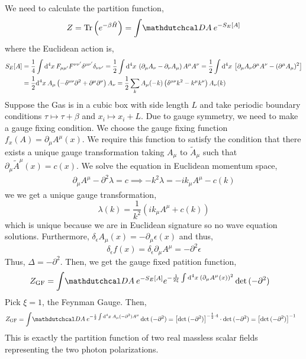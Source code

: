 \documentclass[12pt]{extarticle}
\begin{document}
We need to calculate the partition function,
\begin{align*}
Z = \Tr{e^{- \beta \hamilt}} = \int \pathd{A} e^{- S_E[A]} 
\end{align*}
where the Euclidean action is,
\begin{align*}
S_E[A] & = \frac{1}{4} \int \mathrm{d}^{4} x \: F_{\mu \mu'} F^{\nu \nu'} \delta^{\mu \nu'} \delta_{\nu \nu'} = \frac{1}{2} \int \mathrm{d}^{4} x \: \left( \partial_\mu A_{\nu} - \partial_\nu A_\mu \right) A^\mu A^\nu = \frac{1}{2} \int \mathrm{d}^{4} x \: \left[ \partial_\mu A_\nu \partial^\mu A^\nu - ( \partial^\mu A_{\mu})^2 \right]
\\
& = \frac{1}{2} \mathrm{d}^{4} x \: A_\mu \left( - \delta^{\mu \nu} \partial^2 + \partial^\mu \partial^\nu \right) A_\nu = \frac{1}{2} \sum_{k} A_\mu(-k) \left( \delta^{\mu \nu} k^2 - k^\mu k^\nu \right) A_\nu(k)
\end{align*} 
Suppose the Gas is in a cubic box with side length $L$ and take periodic boundary conditions $\tau \mapsto \tau + \beta$ and $x_i \mapsto x_i + L$. 
Due to gauge symmetry, we need to make a gauge fixing condition. We choose the gauge fixing function $f_x(A) = \partial_\mu A^\mu(x)$. We require this function to satisfy the condition that there exists a unique gauge transformation taking $A_\mu$ to $\tilde{A}_\mu$ such that $\partial_\mu \tilde{A}^\mu(x) = c(x)$. We solve the equation in Euclidean momentum space,
\begin{align*}
\partial_\mu A^\mu - \partial^2 \lambda = c \implies - k^2 \lambda = - i k_\mu A^\mu - c(k)
\end{align*}
we we get a unique gauge transformation,
\[ \lambda(k) = \frac{1}{k^2} \left( i k_\mu A^\mu + c(k) \right) \]
which is unique because we are in Euclidean signature so no wave equation solutions. Furthermore, $\delta_{\epsilon} A_\mu(x) = - \partial_\mu \epsilon(x)$ and thus,
\[ \delta_{\epsilon} f(x) = \delta_{\epsilon} \partial_\mu A^\mu = - \partial^2 \epsilon \]
Thus, $\Delta = - \partial^2$. Then, we get the gauge fixed patition function,
\newcommand{\GF}{\mathrm{GF}}
\begin{align*}
Z_{\GF} & = \int \pathd{A} e^{- S_E[A] } e^{- \frac{1}{2 \xi} \int \dn{4}{x} \left( \partial_\mu A^\mu(x) \right)^2} \det{(- \partial^2) }
\end{align*}
Pick $\xi = 1$, the Feynman Gauge. Then,
\begin{align*}
Z_{\GF} & = \int \pathd{A} e^{-\frac{1}{2} \int \dn{4}{x} A_\mu (- \partial^2) A^\mu } \det{(-\partial^2)} = \left[ \det{(-\partial^2)} \right]^{-\frac{1}{2} \cdot 4} \cdot \det{( - \partial^2 ) } = \left[ \det{(-\partial^2)} \right]^{-1}
\end{align*}
This is exactly the partition function of two real massless scalar fields representing the two photon polarizations. 
\end{document}
